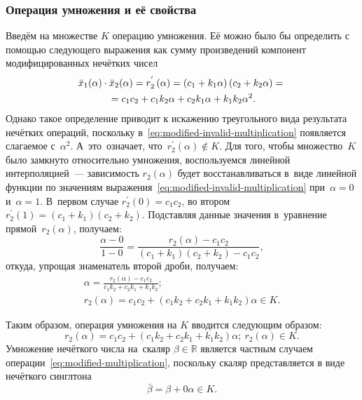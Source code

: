 \subsubsection{Операция умножения и её свойства}
Введём на множестве $K$ операцию умножения. Её можно было бы определить с помощью следующего выражения как сумму произведений компонент модифицированных нечётких чисел
\begin{gather}
  \bar{x}_1(\alpha )\cdot \bar{x}_2(\alpha )=r_{2}^{'}\left( \alpha  \right)=\left( c_1+k_1\alpha  \right)\left( c_2+k_2\alpha \right)={} \notag \\
  \label{eq:modified-invalid-multiplication}
  {}= c_1 c_2+c_1 k_2\alpha+c_2 k_1\alpha+k_1 k_2\alpha^2.
\end{gather}
Однако такое определение приводит к искажению треугольного вида результата нечётких операций, поскольку в~\eqref{eq:modified-invalid-multiplication} появляется слагаемое с~$\alpha^2$. А~это~означает, что~$r_{2}^{'}\left( \alpha  \right)\notin K$. Для того, чтобы множество~$K$ было замкнуто относительно умножения, воспользуемся линейной интерполяцией~--- зависимость $r_2\left(\alpha \right)$ будет восстанавливаться в~виде линейной функции по значениям выражения~\eqref{eq:modified-invalid-multiplication} при~$\alpha =0$ и~$\alpha =1$. В~первом случае $r_{2}^{'}\left( 0 \right)=c_1c_2$, во втором $r_{2}^{'}\left( 1 \right)=\left(c_1+k_1 \right)\left( c_2+k_2 \right)$. Подставляя данные значения в~уравнение прямой~$r_2\left( \alpha \right)$, получаем:
\begin{equation*}
  \frac{\alpha-0}{1-0}=\frac{r_2\left( \alpha \right)-c_1 c_2}{\left(c_1+k_1 \right)\left( c_2+k_2 \right)-c_1 c_2},
\end{equation*}
откуда, упрощая знаменатель второй дроби, получаем:
\begin{gather*}
  \alpha =\frac{r_2\left( \alpha \right)-c_1 c_2}{c_1 k_2+c_2 k_1+k_1 k_2}; \\
  r_2\left( \alpha \right)=c_1 c_2+\left(c_1 k_2+ c_2 k_1 +k_1 k_2 \right)\alpha \in K.
\end{gather*}

Таким образом, операция умножения на $K$ вводится следующим образом:
\begin{equation}
\label{eq:modified-multiplication}
  r_2\left( \alpha \right)=c_1 c_2+\left(c_1 k_2+ c_2 k_1 +k_1 k_2 \right)\alpha;\ r_2\left( \alpha  \right)\in K.
\end{equation}
Умножение нечёткого числа на~скаляр $\beta \in \mathbb{R}$ является частным случаем операции~\eqref{eq:modified-multiplication}, поскольку скаляр представляется в виде нечёткого синглтона
\begin{equation*}
  \bar{\beta }=\beta +0\alpha \in K.
\end{equation*}

